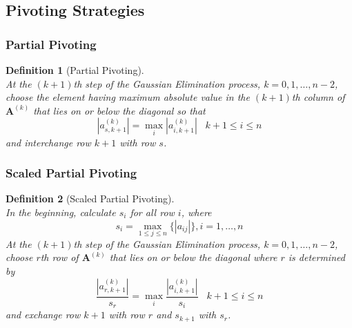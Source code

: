 \documentclass[12pt]{article}
\newtheorem{definition}{Definition}[section]
\theoremstyle{definition}
\begin{document}
\subsection{Pivoting Strategies}
\subsubsection{Partial Pivoting}
\begin{definition}[Partial Pivoting]\hfill\\\normalfont
At the $(k+1)$th step of the Gaussian Elimination process, $k = 0,1,\ldots, n-2$, choose the element having maximum absolute value in the $(k+1)$th column of $\mathbf{A}^{(k)}$ that lies on or below the diagonal so that
\[
|a_{s,k+1}^{(k)}|=\max_{i}|a_{i,k+1}^{(k)}|\;\;\;k+1\leq i\leq n
\]
and interchange row $k+1$ with row $s$.
\end{definition}
\subsubsection{Scaled Partial Pivoting}
\begin{definition}[Scaled Partial Pivoting]\hfill\\\normalfont
In the beginning, calculate $s_i$ for all row $i$, where
\[
s_i = \max_{1\leq j\leq n}\{|a_{ij}|\} , i = 1, \ldots, n
\]
At the $(k+1)$th step of the Gaussian Elimination process, $k = 0,1,\ldots, n-2$, choose $r$th row of $\mathbf{A}^{(k)}$ that lies on or below the diagonal where $r$ is determined by
\[
\frac{|a_{r,k+1}^{(k)}|}{s_r}=\max_{i}\frac{|a_{i,k+1}^{(k)}|}{s_i}\;\;\;k+1\leq i\leq n
\]
and exchange row $k+1$ with row $r$ and $s_{k+1}$ with $s_{r}$.
\end{definition}
\clearpage
\end{document}
